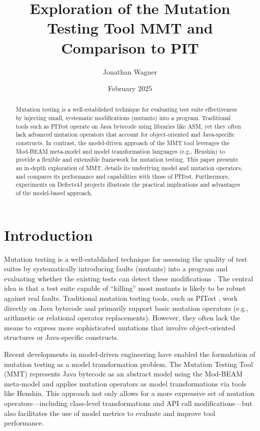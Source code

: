 \documentclass[sigplan, nonacm]{acmart}
\title{Exploration of the Mutation Testing Tool MMT and Comparison to PIT}
\author{Jonathan Wagner}
\affiliation{
  \institution{Philipps-University Marburg}
  \city{Marburg}
  \country{Germany}
}
\date{February 2025}
\begin{document}
\begin{abstract}
	Mutation testing is a well-established technique for evaluating test suite effectiveness by injecting small, systematic modifications (mutants) into a program. Traditional tools such as PITest operate on Java bytecode using libraries like ASM, yet they often lack advanced mutation operators that account for object-oriented and Java-specific constructs. In contrast, the model-driven approach of the MMT tool leverages the Mod-BEAM meta-model and model transformation languages (e.g., Henshin) to provide a flexible and extensible framework for mutation testing. This paper presents an in-depth exploration of MMT, details its underlying model and mutation operators, and compares its performance and capabilities with those of PITest. Furthermore, experiments on Defects4J projects illustrate the practical implications and advantages of the model-based approach.
\end{abstract}

\maketitle

\section{Introduction}
Mutation testing is a well-established technique for assessing the quality of test suites by systematically introducing faults (mutants) into a program and evaluating whether the existing tests can detect these modifications \cite{Offutt2001}. The central idea is that a test suite capable of “killing” most mutants is likely to be robust against real faults. Traditional mutation testing tools, such as PITest \cite{Coles2016}, work directly on Java bytecode and primarily support basic mutation operators (e.g., arithmetic or relational operator replacements). However, they often lack the means to express more sophisticated mutations that involve object-oriented structures or Java-specific constructs.

Recent developments in model-driven engineering have enabled the formulation of mutation testing as a model transformation problem. The Mutation Testing Tool (MMT) \cite{Bockisch2024demonstration,Bockisch2024} represents Java bytecode as an abstract model using the Mod-BEAM meta-model and applies mutation operators as model transformations via tools like Henshin. This approach not only allows for a more expressive set of mutation operators—including class-level transformations and API call modifications—but also facilitates the use of model metrics to evaluate and improve tool performance.
\end{document}
